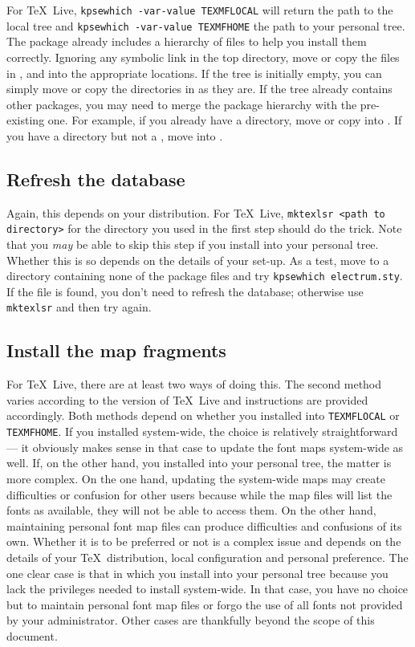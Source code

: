 \documentclass[11pt,british]{article}
\begin{document}
For \TeX~Live, \verb|kpsewhich -var-value TEXMFLOCAL| will return the path to the local tree and \verb|kpsewhich -var-value TEXMFHOME| the path to your personal tree. The package already includes a hierarchy of files to help you install them correctly. Ignoring any symbolic link in the top directory, move or copy the files in ,  and  into the appropriate locations. If the tree is initially empty, you can simply move or copy the directories in as they are. If the tree already contains other packages, you may need to merge the package hierarchy with the pre-existing one. For example, if you already have a  directory, move or copy  into . If you have a  directory but not a , move  into .

\subsection{Refresh the database}

Again, this depends on your distribution. For \TeX~Live, \verb|mktexlsr <path to directory>| for the directory you used in the first step should do the trick. Note that you \emph{may} be able to skip this step if you install into your personal tree. Whether this is so depends on the details of your set-up. As a test, move to a directory containing none of the package files and try \verb|kpsewhich electrum.sty|. If the file is found, you don't need to refresh the database; otherwise use \verb|mktexlsr| and then try again.

\subsection{Install the map fragments}

For \TeX~Live, there are at least two ways of doing this. The second method varies according to the version of \TeX~Live and instructions are provided accordingly. Both methods depend on whether you installed into \verb|TEXMFLOCAL| or \verb|TEXMFHOME|. If you installed system-wide, the choice is relatively straightforward --- it obviously makes sense in that case to update the font maps system-wide as well. If, on the other hand, you installed into your personal tree, the matter is more complex. On the one hand, updating the system-wide maps may create difficulties or confusion for other users because while the map files will list the fonts as available, they will not be able to access them. On the other hand, maintaining personal font map files can produce difficulties and confusions of its own. Whether it is to be preferred or not is a complex issue and depends on the details of your \TeX\ distribution, local configuration and personal preference. The one clear case is that in which you install into your personal tree because you lack the privileges needed to install system-wide. In that case, you have no choice but to maintain personal font map files or forgo the use of all fonts not provided by your administrator. Other cases are thankfully beyond the scope of this document.
\end{document}
